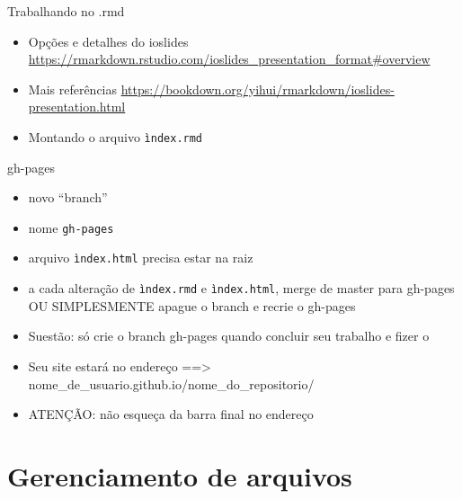 \documentclass[
  9pt,
  ignorenonframetext,
]{beamer}
\begin{document}
\begin{frame}[fragile]{Trabalhando no .rmd}
\protect\hypertarget{trabalhando-no-.rmd}{}
\begin{itemize}
\item
  Opções e detalhes do ioslides
  \url{https://rmarkdown.rstudio.com/ioslides_presentation_format\#overview}
\item
  Mais referências
  \url{https://bookdown.org/yihui/rmarkdown/ioslides-presentation.html}
\item
  Montando o arquivo \texttt{ìndex.rmd}
\end{itemize}
\end{frame}

\begin{frame}[fragile]{gh-pages}
\protect\hypertarget{gh-pages}{}
\begin{itemize}
\item
  novo ``branch''
\item
  nome \texttt{gh-pages}
\item
  arquivo \texttt{ìndex.html} precisa estar na raiz
\item
  a cada alteração de \texttt{ìndex.rmd} e \texttt{ìndex.html}, merge de
  master para gh-pages OU SIMPLESMENTE apague o branch e recrie o
  gh-pages
\item
  Suestão: só crie o branch gh-pages quando concluir seu trabalho e
  fizer o
\item
  Seu site estará no endereço ==\textgreater{}
  nome\_de\_usuario.github.io/nome\_do\_repositorio/
\item
  ATENÇÃO: não esqueça da barra final no endereço
\end{itemize}
\end{frame}

\hypertarget{gerenciamento-de-arquivos}{%
\section{Gerenciamento de arquivos}\label{gerenciamento-de-arquivos}}
\end{document}

